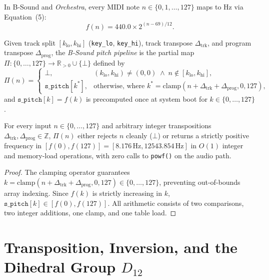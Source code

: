 In B-Sound and \emph{Orchestra}, every MIDI note $n \in \{0, 1, \dots, 127\}$ maps to Hz via Equation~(5):
\begin{equation}
\label{eq:midi-freq}
f(n) = 440.0 \times 2^{(n - 69)/12}.
\end{equation}

\begin{definition}
Given track split $[k_{\mathrm{lo}}, k_{\mathrm{hi}}]$ (\texttt{key\_lo}, \texttt{key\_hi}), track transpose $\Delta_{\mathrm{trk}}$, and program transpose $\Delta_{\mathrm{prog}}$, the \emph{B-Sound pitch pipeline} is the partial map $\Pi : \{0,\dots,127\} \to \mathbb{R}_{>0} \cup \{\bot\}$ defined by
\begin{equation}
\Pi(n) =
\begin{cases}
\bot, & (k_{\mathrm{lo}}, k_{\mathrm{hi}}) \ne (0,0) \;\wedge\; n \notin [k_{\mathrm{lo}}, k_{\mathrm{hi}}], \\[4pt]
\texttt{s\_pitch}[k^*], & \text{otherwise, where } k^* = \mathrm{clamp}(n + \Delta_{\mathrm{trk}} + \Delta_{\mathrm{prog}}, 0, 127),
\end{cases}
\end{equation}
and $\texttt{s\_pitch}[k] = f(k)$ is precomputed once at system boot for $k \in \{0,\dots,127\}$.
\end{definition}

\begin{proposition}
For every input $n \in \{0,\dots,127\}$ and arbitrary integer transpositions $\Delta_{\mathrm{trk}}, \Delta_{\mathrm{prog}} \in \mathbb{Z}$, $\Pi(n)$ either rejects $n$ cleanly ($\bot$) or returns a strictly positive frequency in $[f(0), f(127)] = [8.176\,\text{Hz}, 12543.854\,\text{Hz}]$ in $O(1)$ integer and memory-load operations, with zero calls to \texttt{powf()} on the audio path.
\end{proposition}

\begin{proof}
The clamping operator guarantees $k = \mathrm{clamp}(n + \Delta_{\mathrm{trk}} + \Delta_{\mathrm{prog}}, 0, 127) \in \{0,\dots,127\}$, preventing out-of-bounds array indexing. Since $f(k)$ is strictly increasing in $k$, $\texttt{s\_pitch}[k] \in [f(0), f(127)]$. All arithmetic consists of two comparisons, two integer additions, one clamp, and one table load.
\end{proof}

\section{Transposition, Inversion, and the Dihedral Group $D_{12}$}

